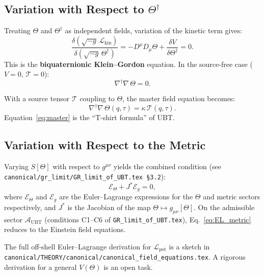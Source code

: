 \documentclass[11pt,a4paper]{article}
\theoremstyle{definition}
\theoremstyle{remark}
\begin{document}
\subsection{Variation with Respect to $\Theta^\dagger$}

Treating $\Theta$ and $\Theta^\dagger$ as independent fields, variation of the
kinetic term gives:
\begin{equation}
  \frac{\delta(\sqrt{-g}\,\mathcal{L}_{\mathrm{kin}})}
       {\delta(\sqrt{-g}\,\Theta^\dagger)}
  = -D^\mu D_\mu \Theta + \frac{\delta V}{\delta \Theta^\dagger} = 0.
\end{equation}
This is the \textbf{biquaternionic Klein--Gordon} equation.  In the
source-free case ($V=0$, $\mathcal{T}=0$):
\begin{equation}\label{eq:KG}
  \nabla^\dagger\nabla\,\Theta = 0.
\end{equation}

With a source tensor $\mathcal{T}$ coupling to $\Theta$, the master
field equation becomes:
\begin{equation}\label{eq:master}
  \boxed{\nabla^\dagger\nabla\,\Theta(q,\tau)
  = \kappa\,\mathcal{T}(q,\tau).}
\end{equation}
Equation~\eqref{eq:master} is the ``T-shirt formula'' of UBT.

\subsection{Variation with Respect to the Metric}

Varying $S[\Theta]$ with respect to $g^{\mu\nu}$ yields the combined condition
(see \texttt{canonical/gr\_limit/GR\_limit\_of\_UBT.tex \S3.2}):
\begin{equation}\label{eq:EL_metric}
  \mathcal{E}_\Theta + J^*\mathcal{E}_g = 0,
\end{equation}
where $\mathcal{E}_\Theta$ and $\mathcal{E}_g$ are the Euler--Lagrange
expressions for the $\Theta$ and metric sectors respectively, and $J^*$ is
the Jacobian of the map $\Theta \mapsto g_{\mu\nu}[\Theta]$.  On the
admissible sector $\mathcal{A}_{\mathrm{UBT}}$ (conditions C1--C6 of
\texttt{GR\_limit\_of\_UBT.tex}), Eq.~\eqref{eq:EL_metric} reduces to the
Einstein field equations.

\begin{tcolorbox}[colback=yellow!8!white,colframe=orange!60!black,title=Open item]
The full off-shell Euler--Lagrange derivation for $\mathcal{L}_{\mathrm{pot}}$
is a sketch in \texttt{canonical/THEORY/canonical/canonical\_field\_equations.tex}.
A rigorous derivation for a general $V(\Theta)$ is an open task.
\end{tcolorbox}
\end{document}
